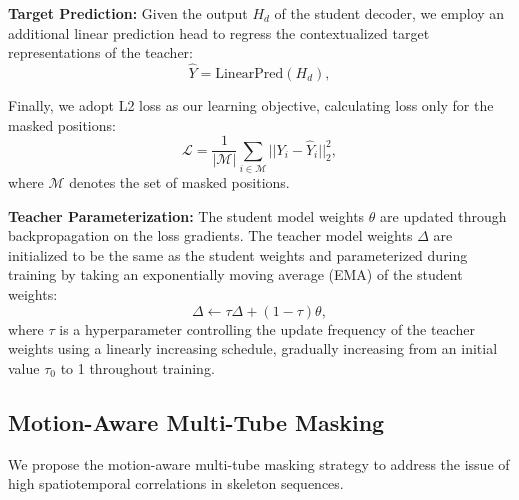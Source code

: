 \noindent \textbf{Target Prediction:}
Given the output $H_d$ of the student decoder, we employ an additional linear prediction head to
regress the contextualized target representations of the teacher:  
\begin{equation}
    \label{eq:target_pred}
    \hat{Y} = \text{LinearPred}(H_d),
\end{equation}

Finally, we adopt L2 loss as our learning objective, calculating loss only for the
masked positions:
\begin{equation}
    \label{eq:loss}
    \mathcal{L} = \frac{1}{|\mathcal{M}|}\sum_{i \in \mathcal{M}}||Y_i - \hat{Y}_i||_2^2,
\end{equation}
where $\mathcal{M}$ denotes the set of masked positions.

\noindent \textbf{Teacher Parameterization:}
The student model weights $\theta$ are updated through backpropagation on the loss
gradients. The teacher model weights $\Delta$ are initialized to be the same as the
student weights and parameterized during training by taking an exponentially moving
average (EMA) of the student weights:  
\begin{equation}
    \label{eq:ema}
    \Delta \leftarrow \tau\Delta + (1-\tau)\theta,
\end{equation}
where $\tau$ is a hyperparameter controlling the update frequency of the teacher
weights using a linearly increasing schedule, gradually increasing from an initial
value $\tau_0$ to 1 throughout training.

\subsection{Motion-Aware Multi-Tube Masking}
\label{sec:motion-aware_tube_masking}
We propose the motion-aware multi-tube masking strategy to address the issue of high
spatiotemporal correlations in skeleton sequences.

